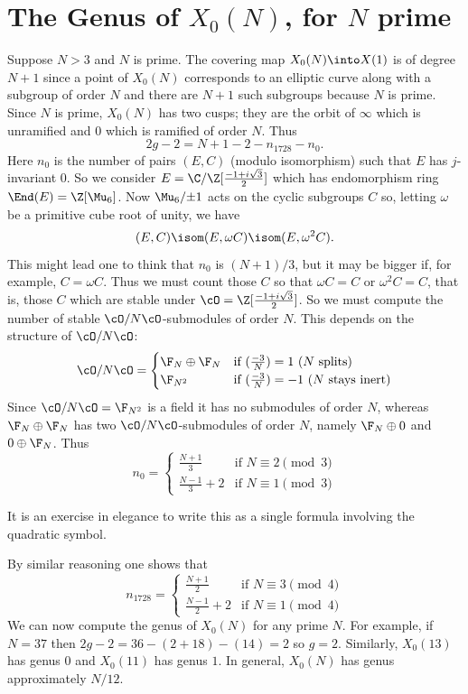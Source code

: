 \documentclass{report}
\begin{document}
\section{The Genus of $X_0(N)$, for $N$ prime}\label{sec:genusX0N}
Suppose $N>3$ and $N$ is prime. The covering map $X_0(N)\into X(1)$ is
of degree $N+1$ since a point of $X_0(N)$ corresponds to an elliptic
curve along with a subgroup of order $N$ and there are $N+1$ such
subgroups because $N$ is prime.  Since $N$ is prime, $X_0(N)$ has two
cusps; they are the orbit of $\infty$ which is unramified and $0$
which is ramified of order $N$.  Thus
$$2g-2=N+1-2-n_{1728}-n_0.$$
Here $n_0$ is the number of pairs $(E,C)$ (modulo isomorphism) such that $E$
has $j$-invariant $0$. So we consider $E=\C/\Z[\frac{-1+i\sqrt{3}}{2}]$ which
has endomorphism ring $\End(E)=\Z[\Mu_6]$.
Now $\Mu_6/{\pm 1}$ acts on the cyclic subgroups
$C$ so, letting $\omega$ be a primitive cube root of unity, we have
$$(E,C)\isom(E,\omega C)\isom(E,\omega^2 C).$$
This might lead one to think that $n_0$ is $(N+1)/3$, but it may
be bigger if, for example, $C=\omega{}C$.
Thus we must count those $C$ so that $\omega C=C$ or $\omega^2 C=C$, that is,
those $C$ which are stable under $\cO=\Z[\frac{-1+i\sqrt{3}}{2}]$.
So we must compute the number of stable $\cO/N\cO$-submodules of order $N$.
This depends on the structure of $\cO/N\cO$:
$$\cO/N\cO = \begin{cases}
          \F_N\oplus\F_N&\text{if $(\frac{-3}{N})=1$ ($N$ splits)}\\
          \F_{N^2} &\text{if $(\frac{-3}{N})=-1$ ($N$ stays inert)}
\end{cases}
$$
Since $\cO/N\cO=\F_{N^2}$ is a field it has no submodules of order $N$,
whereas $\F_{N}\oplus\F_{N}$ has two $\cO/N\cO$-submodules of
order $N$, namely $\F_N\oplus{}0$ and $0\oplus\F_N$.
Thus
$$n_0 = \begin{cases}
\frac{N+1}{3} & \text{if $N\equiv 2\pmod{3}$}\\
\frac{N-1}{3}+2 & \text{if $N\equiv 1\pmod{3}$}
\end{cases}
$$
\begin{exercise} It is an exercise in elegance to write this
as a single formula involving the quadratic symbol.
\end{exercise}

By similar reasoning one shows that
$$n_{1728}=\begin{cases}
\frac{N+1}{2} & \text{if $N\equiv 3\pmod{4}$}\\
\frac{N-1}{2}+2 & \text{if $N\equiv 1\pmod{4}$}
\end{cases}
$$
We can now compute the genus of $X_0(N)$ for any prime $N$.
For example, if $N=37$ then
$2g-2=36-(2+18)-(14)=2$ so $g=2$. Similarly, $X_0(13)$ has genus $0$ and
$X_0(11)$ has genus $1$. In general, $X_0(N)$ has genus approximately
$N/12$.
\end{document}
